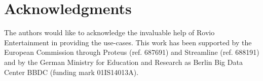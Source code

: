 \section{Acknowledgments}
The authors would like to acknowledge the invaluable help of Rovio Entertainment in providing the use-cases. This work has been supported by the European Commission through Proteus (ref. 687691) and Streamline (ref. 688191) and by the German Ministry for Education and Research as Berlin Big Data Center BBDC (funding mark 01IS14013A). 